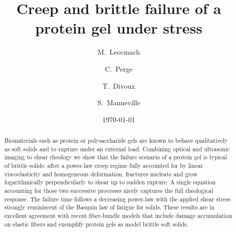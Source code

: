 \documentclass[twocolumn,superscriptaddress,showpacs,preprintnumbers,amsmath,amssymb,prl]{revtex4}
\begin{document}

 \title{Creep and brittle failure of a protein gel under stress}

\author{M.~Leocmach}
\author{C.~Perge}
\author{T.~Divoux}
\author{S.~Manneville}

\date{\today}

\begin{abstract}
Biomaterials such as protein or polysaccharide gels are known to behave qualitatively as soft solids and to rupture under an external load. Combining optical and ultrasonic imaging to shear rheology we show that the failure scenario of a protein gel is typical of brittle solids: after a power-law creep regime fully accounted for by linear viscoelasticity and homogeneous deformation, fractures nucleate and grow logarithmically perpendicularly to shear up to sudden rupture. A single equation accounting for those two successive processes nicely captures the full rheological response. The failure time follows a decreasing power-law with the applied shear stress strongly reminiscent of the Basquin law of fatigue for solids. These results are in excellent agreement with recent fiber-bundle models that include damage accumulation on elastic fibers and exemplify protein gels as model brittle soft solids.
\end{abstract}

\pacs{}
\maketitle
\end{document}

